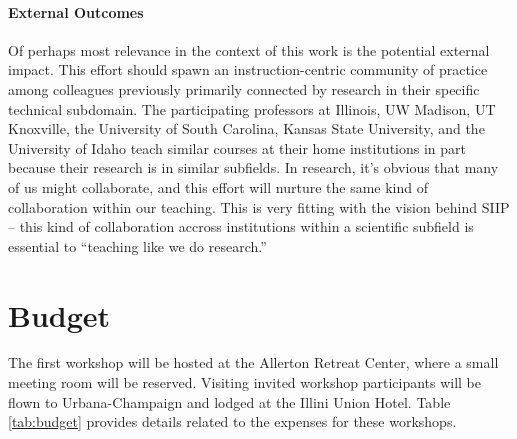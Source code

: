 \documentclass[11pt]{article}
\begin{document}
          \paragraph{External Outcomes} Of perhaps most relevance in the
          context of this work is the potential external impact. This effort
          should spawn an instruction-centric community of practice among
          colleagues previously primarily connected by research 
          in their specific technical subdomain. 
          The participating professors at Illinois, UW Madison, UT Knoxville, 
          the University of South Carolina, Kansas State University, and the 
          University of Idaho teach similar courses at their home institutions 
          in part because their research is in similar subfields. In research, 
          it's obvious that many of us might collaborate, and this effort will 
          nurture the same kind of collaboration within our teaching. This is 
          very fitting with the vision behind SIIP -- this kind of collaboration 
          accross institutions within a scientific subfield is essential to 
          ``teaching like we do research.'' 

          \section{Budget}
          The first workshop will be hosted at the Allerton Retreat Center, 
          where a small meeting room will be reserved. Visiting 
          invited workshop participants will be flown to Urbana-Champaign and 
          lodged at the Illini Union Hotel. Table \ref{tab:budget} provides 
          details related to the expenses for these workshops.
\end{document}
